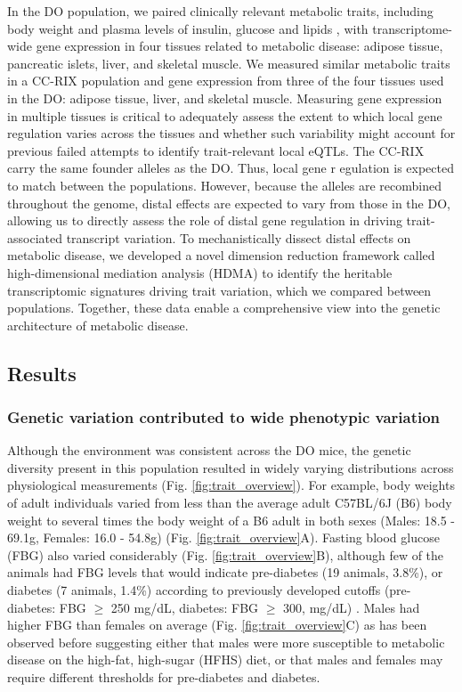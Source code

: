 \documentclass[
]{article}
\begin{document}
In the DO population, we paired clinically relevant metabolic traits,
including body weight and plasma levels of insulin, glucose and lipids
\cite{pmid29567659}, with transcriptome-wide gene expression in four
tissues related to metabolic disease: adipose tissue, pancreatic islets,
liver, and skeletal muscle. We measured similar metabolic traits in a
CC-RIX population and gene expression from three of the four tissues
used in the DO: adipose tissue, liver, and skeletal muscle. Measuring
gene expression in multiple tissues is critical to adequately assess the
extent to which local gene regulation varies across the tissues and
whether such variability might account for previous failed attempts to
identify trait-relevant local eQTLs. The CC-RIX carry the same founder
alleles as the DO. Thus, local gene r egulation is expected to match
between the populations. However, because the alleles are recombined
throughout the genome, distal effects are expected to vary from those in
the DO, allowing us to directly assess the role of distal gene
regulation in driving trait-associated transcript variation. To
mechanistically dissect distal effects on metabolic disease, we
developed a novel dimension reduction framework called high-dimensional
mediation analysis (HDMA) to identify the heritable transcriptomic
signatures driving trait variation, which we compared between
populations. Together, these data enable a comprehensive view into the
genetic architecture of metabolic disease.

\subsection{Results}\label{results}

\subsubsection{Genetic variation contributed to wide phenotypic
variation}\label{genetic-variation-contributed-to-wide-phenotypic-variation}

Although the environment was consistent across the DO mice, the genetic
diversity present in this population resulted in widely varying
distributions across physiological measurements (Fig.
\ref{fig:trait_overview}). For example, body weights of adult
individuals varied from less than the average adult C57BL/6J (B6) body
weight to several times the body weight of a B6 adult in both sexes
(Males: 18.5 - 69.1g, Females: 16.0 - 54.8g) (Fig.
\ref{fig:trait_overview}A). Fasting blood glucose (FBG) also varied
considerably (Fig. \ref{fig:trait_overview}B), although few of the
animals had FBG levels that would indicate pre-diabetes (19 animals,
3.8\%), or diabetes (7 animals, 1.4\%) according to previously developed
cutoffs (pre-diabetes: FBG \(\geq\) 250 mg/dL, diabetes: FBG \(\geq\)
300, mg/dL) \cite{pmid17018838}. Males had higher FBG than females on
average (Fig. \ref{fig:trait_overview}C) as has been observed before
suggesting either that males were more susceptible to metabolic disease
on the high-fat, high-sugar (HFHS) diet, or that males and females may
require different thresholds for pre-diabetes and diabetes.
\end{document}

